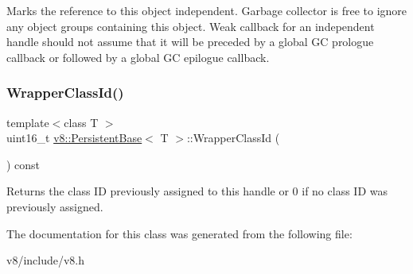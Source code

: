 Marks the reference to this object independent. Garbage collector is free to ignore any object groups containing this object. Weak callback for an independent handle should not assume that it will be preceded by a global GC prologue callback or followed by a global GC epilogue callback. \mbox{\label{classv8_1_1PersistentBase_ac81668d70faff8ee84aa6db410b3ce3c}} 
\subsubsection{\texorpdfstring{Wrapper\+Class\+Id()}{WrapperClassId()}}
{\footnotesize\ttfamily template$<$class T $>$ \\
uint16\+\_\+t \mbox{\hyperlink{classv8_1_1PersistentBase}{v8\+::\+Persistent\+Base}}$<$ T $>$\+::Wrapper\+Class\+Id (\begin{DoxyParamCaption}{ }\end{DoxyParamCaption}) const}

Returns the class ID previously assigned to this handle or 0 if no class ID was previously assigned. 

The documentation for this class was generated from the following file\+:\begin{DoxyCompactItemize}
\item 
v8/include/v8.\+h\end{DoxyCompactItemize}

